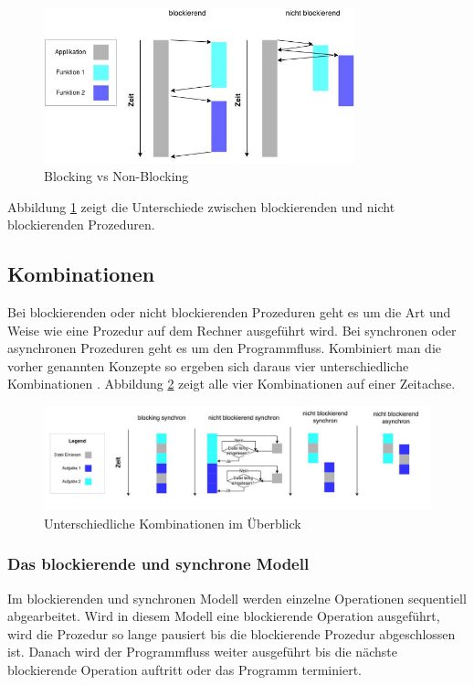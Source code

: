 \begin{figure}[!htb]
  \centering
  \includegraphics[width=9cm]{images/blocking_vs_nonblocking.jpg}
  \caption{
    Blocking vs Non-Blocking
  }
  \label{figure:blocking_vs_non_blocking}
\end{figure}

Abbildung \ref{figure:blocking_vs_non_blocking} zeigt die Unterschiede zwischen blockierenden und nicht blockierenden Prozeduren.

\subsection{Kombinationen}
Bei blockierenden oder nicht blockierenden Prozeduren geht es um die Art und Weise wie eine Prozedur auf dem Rechner ausgeführt wird. Bei synchronen oder asynchronen Prozeduren geht es um den Programmfluss. Kombiniert man die vorher genannten Konzepte so ergeben sich daraus vier unterschiedliche Kombinationen \cite[p. 48]{Erb2012}. Abbildung \ref{figure:synchron_blocking} zeigt alle vier Kombinationen auf einer Zeitachse. 

\begin{figure}[!htb]
  \centering
  \includegraphics[width=16cm]{images/synchron_blocking.jpg}
  \caption{
    Unterschiedliche Kombinationen im Überblick
  }
  \label{figure:synchron_blocking}
\end{figure}

\subsubsection{Das blockierende und synchrone Modell}
Im blockierenden und synchronen Modell werden einzelne Operationen sequentiell abgearbeitet. Wird in diesem Modell eine blockierende Operation ausgeführt, wird die Prozedur so lange pausiert bis die blockierende Prozedur abgeschlossen ist. Danach wird der Programmfluss weiter ausgeführt bis die nächste blockierende Operation auftritt oder das Programm terminiert.

